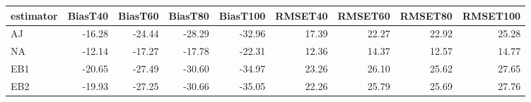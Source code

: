 \begin{table}[ht]
\centering
\begin{tabular}{lrrrrrrrr}
  \toprule
estimator & BiasT40 & BiasT60 & BiasT80 & BiasT100 & RMSET40 & RMSET60 & RMSET80 & RMSET100 \\ 
  \midrule
AJ & -16.28 & -24.44 & -28.29 & -32.96 & 17.39 & 22.27 & 22.92 & 25.28 \\ 
  NA & -12.14 & -17.27 & -17.78 & -22.31 & 12.36 & 14.37 & 12.57 & 14.77 \\ 
  EB1 & -20.65 & -27.49 & -30.60 & -34.97 & 23.26 & 26.10 & 25.62 & 27.65 \\ 
  EB2 & -19.93 & -27.25 & -30.66 & -35.05 & 22.26 & 25.79 & 25.69 & 27.76 \\ 
   \bottomrule
\end{tabular}
\end{table}
